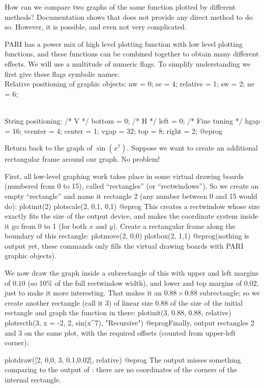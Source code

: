 How can we compare two graphs of the same function plotted by different
methods?  Documentation shows that  does not provide any direct
method to do so.  However, it is possible, and even not very complicated.

PARI has a power mix of high level plotting function with low level plotting
functions, and these functions can be combined together to obtain many
different effects. We will use a multitude of numeric flags. To simplify
understanding we first give these flags symbolic names:
\bprog
  \\ Relative positioning of graphic objects:
  nw = 0;  se = 4;  relative = 1;
  sw = 2;  ne = 6;

  \\ String positioning:
  /* V */ bottom  =  0;  /* H */  left   = 0;  /* Fine tuning */ hgap = 16;
          vcenter =  4;           center = 1;                    vgap = 32;
          top     =  8;           right  = 2;
@eprog

 Return back to the graph of $\sin(x^7)$.  Suppose we want to create an
additional rectangular frame around our graph.  No problem!

First, all low-level graphing work takes place in some virtual drawing
boards (numbered from 0 to 15), called ``rectangles'' (or ``rectwindows'').
So we create an empty ``rectangle'' and name it rectangle 2 (any
number between 0 and 15 would do):
\bprog
  plotinit(2)
  plotscale(2, 0,1, 0,1)
@eprog
This creates a rectwindow whose size exactly fits the size of the output
device, and makes the coordinate system inside it go from 0 to 1 (for both
$x$ and $y$). Create a rectangular frame along the boundary of this rectangle:
\bprog
  plotmove(2, 0,0)
  plotbox(2, 1,1)
@eprog\noindent (nothing is output yet, these commands only fills the virtual
drawing boards with PARI graphic objects).

We now draw the graph inside a subrectangle of this with upper
and left margins of $0.10$ (so 10\% of the full rectwindow width), and
lower and top margins of $0.02$, just to make it more interesting. That
makes it an $0.88 \times 0.88$ subrectangle; so we create another rectangle
(call it 3) of linear size 0.88 of the size of the initial rectangle and
graph the function in there:
\bprog
  plotinit(3, 0.88, 0.88, relative)
  plotrecth(3, x = -2, 2, sin(x^7), "Recursive")
@eprog\noindent Finally, output rectangles 2 and 3 on the same plot, with the
required offsets (counted from upper-left corner):

\bprog
  plotdraw([2, 0,0,  3, 0.1,0.02], relative)
@eprog
\noindent The output misses something comparing to the output of
: there are no coordinates of the corners of the internal
rectangle.

